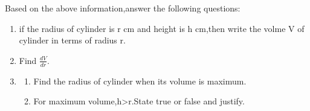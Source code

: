 \documentclass{article}
\begin{document}
\begin{enumerate}
		Based on the above information,answer the following questions:\\
		
			\begin{enumerate}
				\item if the radius of cylinder is r cm and height is h cm,then write the volme V of cylinder in terms of radius r.
					\\
				\item Find $ \frac{dV}{dr} $.
					\\
				\item \begin{enumerate}
						\item Find the radius of cylinder when its volume is maximum.\\
			
		\item For maximum volume,h>r.State true or false and justify.
				
			
				\end{enumerate}
			\end{enumerate}
\end{enumerate}
\end{document}
